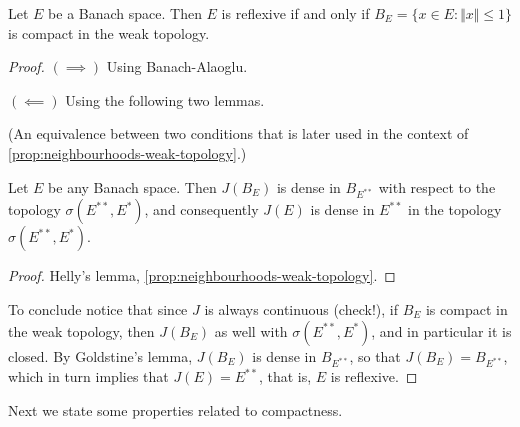 \documentclass{article}
\theoremstyle{definition}
\numberwithin{equation}{section}
\begin{document}
\begin{thm}[Kakutani]
	Let $E$ be a Banach space. Then $E$ is reflexive if and only if $B_E=\{x\in E:\Vert x\Vert\leq1\}$ is compact in the weak topology.
\end{thm}
\begin{proof}\leavevmode
	
	$(\implies)$ Using Banach-Alaoglu.
	
	$(\impliedby)$ Using the following two lemmas.
\begin{lemma}[Helly]
	(An equivalence between two conditions that is later used in the context of \cref{prop:neighbourhoods-weak-topology}.)
\end{lemma}
\begin{lemma}[Goldstine]
	Let $E$ be any Banach space. Then $J(B_E)$ is dense in $B_{E^{**}}$ with respect to the topology $\sigma(E^{**},E^*)$, and consequently $J(E)$ is dense in $E^{**}$ in the topology $\sigma(E^{**},E^*)$.
\end{lemma}
\begin{proof}
	Helly's lemma, \cref{prop:neighbourhoods-weak-topology}.
\end{proof}

To conclude notice that since $J$ is always continuous (check!), if $B_E$ is compact in the weak topology, then $J(B_E)$ as well with $\sigma(E^{**},E^*)$, and in particular it is closed. By Goldstine's lemma, $J(B_E)$ is dense in $B_{E^{**}}$, so that $J(B_E)=B_{E^{**}}$, which in turn implies that $J(E)=E^{**}$, that is, $E$ is reflexive.
\end{proof}

Next we state some properties related to compactness.
\end{document}

